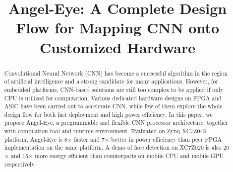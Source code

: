 \documentclass[10pt, conference, compsocconf]{IEEEtran}
\begin{document}
    \captionsetup{singlelinecheck=on}

\title{Angel-Eye: A Complete Design Flow for Mapping CNN onto Customized Hardware}

\author{
}


\maketitle

\begin{abstract}
Convolutional Neural Network (CNN) has become a successful algorithm in the region of artificial intelligence and a strong candidate for many applications. However, for embedded platforms, CNN-based solutions are still too complex to be applied if only CPU is utilized for computation. Various dedicated hardware designs on FPGA and ASIC have been carried out to accelerate CNN, while few of them explore the whole design flow for both fast deployment and high power efficiency. In this paper, we propose Angel-Eye, a programmable and flexible CNN processor architecture, together with compilation tool and runtime environment. Evaluated on Zynq XC7Z045 platform, Angel-Eye is 8$\times$ faster and 7$\times$ better in power efficiency than peer FPGA implementation on the same platform. A demo of face detection on XC7Z020 is also 20$\times$ and 15$\times$ more energy efficient than counterparts on mobile CPU and mobile GPU respectively.
\end{abstract}
\end{document}
